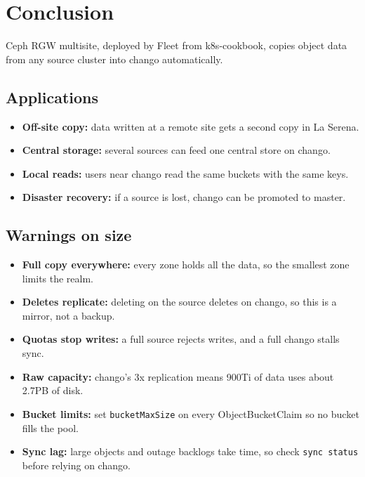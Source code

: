\section{Conclusion}
\label{sec:conclusion}

Ceph RGW multisite, deployed by Fleet from k8s-cookbook, copies object data from any source cluster into chango automatically.

\subsection{Applications}

\begin{itemize}
  \item \textbf{Off-site copy:} data written at a remote site gets a second copy in La Serena.
  \item \textbf{Central storage:} several sources can feed one central store on chango.
  \item \textbf{Local reads:} users near chango read the same buckets with the same keys.
  \item \textbf{Disaster recovery:} if a source is lost, chango can be promoted to master.
\end{itemize}

\subsection{Warnings on size}

\begin{itemize}
  \item \textbf{Full copy everywhere:} every zone holds all the data, so the smallest zone limits the realm.
  \item \textbf{Deletes replicate:} deleting on the source deletes on chango, so this is a mirror, not a backup.
  \item \textbf{Quotas stop writes:} a full source rejects writes, and a full chango stalls sync.
  \item \textbf{Raw capacity:} chango's 3x replication means 900Ti of data uses about 2.7PB of disk.
  \item \textbf{Bucket limits:} set \texttt{bucketMaxSize} on every ObjectBucketClaim so no bucket fills the pool.
  \item \textbf{Sync lag:} large objects and outage backlogs take time, so check \texttt{sync status} before relying on chango.
\end{itemize}
